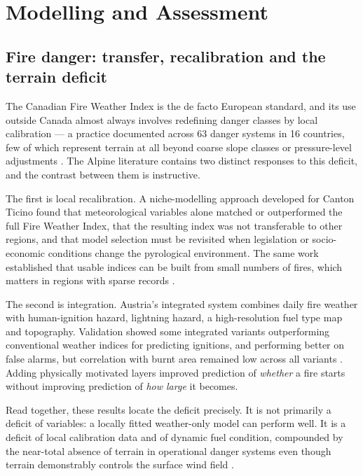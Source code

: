 \documentclass[11pt,a4paper]{article}
\begin{document}
\section{Modelling and Assessment}
\label{sec:modelling}

\subsection{Fire danger: transfer, recalibration and the terrain deficit}

The Canadian Fire Weather Index is the de facto European standard, and its use outside Canada almost always involves redefining danger classes by local calibration --- a practice documented across 63 danger systems in 16 countries, few of which represent terrain at all beyond coarse slope classes or pressure-level adjustments \citep{zacharakis_environmental_2023}. The Alpine literature contains two distinct responses to this deficit, and the contrast between them is instructive.

The first is local recalibration. A niche-modelling approach developed for Canton Ticino found that meteorological variables alone matched or outperformed the full Fire Weather Index, that the resulting index was not transferable to other regions, and that model selection must be revisited when legislation or socio-economic conditions change the pyrological environment. The same work established that usable indices can be built from small numbers of fires, which matters in regions with sparse records \citep{de_angelis_modelling_2015}.

The second is integration. Austria's integrated system combines daily fire weather with human-ignition hazard, lightning hazard, a high-resolution fuel type map and topography. Validation showed some integrated variants outperforming conventional weather indices for predicting ignitions, and performing better on false alarms, but correlation with burnt area remained low across all variants \citep{muller_towards_2020}. Adding physically motivated layers improved prediction of \emph{whether} a fire starts without improving prediction of \emph{how large} it becomes.

Read together, these results locate the deficit precisely. It is not primarily a deficit of variables: a locally fitted weather-only model can perform well. It is a deficit of local calibration data and of dynamic fuel condition, compounded by the near-total absence of terrain in operational danger systems even though terrain demonstrably controls the surface wind field \citep{ozaki_impact_2022, sharples_overview_2009}.
\end{document}
